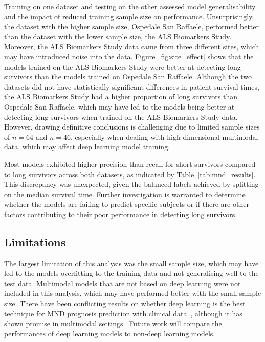 Training on one dataset and testing on the other assessed model generalisability and the impact of reduced training sample size on performance.
Unsurprisingly, the dataset with the higher sample size, Ospedale San Raffaele, performed better than the dataset with the lower sample size, the ALS Biomarkers Study.
Moreover, the ALS Biomarkers Study data came from three different sites, which may have introduced noise into the data.
Figure~\ref{fig:site_effect} shows that the models trained on the ALS Biomarkers Study were better at detecting long survivors than the models trained on Ospedale San Raffaele.
Although the two datasets did not have statistically significant differences in patient survival times, the ALS Biomarkers Study had a higher proportion of long survivors than Ospedale San Raffaele, which may have led to the models being better at detecting long survivors when trained on the ALS Biomarkers Study data.
However, drawing definitive conclusions is challenging due to limited sample sizes of $n=64$ and $n=46$, especially when dealing with high-dimensional multimodal data, which may affect deep learning model training.

Most models exhibited higher precision than recall for short survivors compared to long survivors across both datasets, as indicated by Table~\ref{tab:mnd_results}.
This discrepancy was unexpected, given the balanced labels achieved by splitting on the median survival time.
Further investigation is warranted to determine whether the models are failing to predict specific subjects or if there are other factors contributing to their poor performance in detecting long survivors.

\subsection{Limitations}
The largest limitation of this analysis was the small sample size, which may have led to the models overfitting to the training data and not generalising well to the test data.
Multimodal models that are not based on deep learning were not included in this analysis, which may have performed better with the small sample size.
There have been conflicting results on whether deep learning is the best technique for MND prognosis prediction with clinical data~\cite{pancottiDeepLearningMethods2022, papaizEnsembleimbalancebasedClassificationAmyotrophic2024}, although it has shown promise in multimodal settings~\cite{vanderburghDeepLearningPredictions2017, meierConnectomeBasedPropagation2020}
Future work will compare the performances of deep learning models to non-deep learning models.

